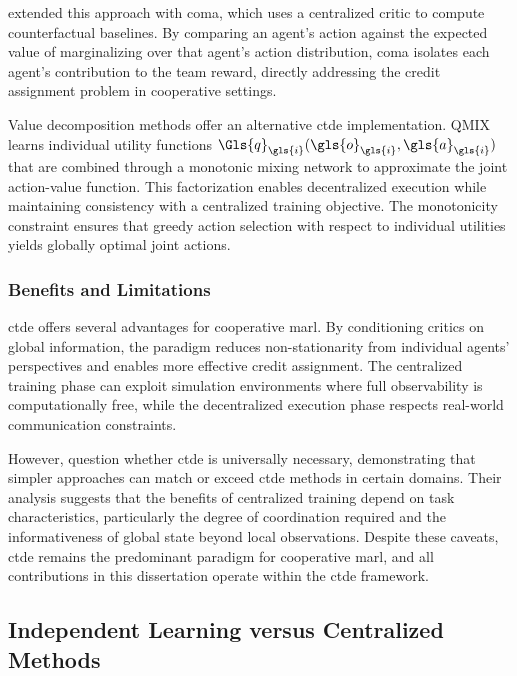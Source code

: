 \cite{foerster2018} extended this approach with \gls{coma}, 
which uses a centralized critic to compute counterfactual baselines. 
By comparing an agent's action against the expected value of 
marginalizing over that agent's action distribution, 
\gls{coma} isolates each agent's contribution to the team reward, 
directly addressing the credit assignment problem in cooperative settings.

Value decomposition methods offer an alternative \gls{ctde} implementation. 
QMIX \cite{rashid2018} learns individual utility functions 
\(\Gls{q}_{\gls{i}}(\gls{o}_{\gls{i}}, \gls{a}_{\gls{i}})\)
that are combined through a monotonic mixing network to 
approximate the joint action-value function.
This factorization enables decentralized execution while 
maintaining consistency with a centralized training objective. 
The monotonicity constraint ensures that greedy action 
selection with respect to individual utilities yields 
globally optimal joint actions.

\subsubsection{Benefits and Limitations}

\gls{ctde} offers several advantages for cooperative \gls{marl}.
By conditioning critics on global information, the paradigm reduces 
non-stationarity from individual agents' perspectives and enables 
more effective credit assignment. The centralized training phase can exploit 
simulation environments where full observability is computationally free, 
while the decentralized execution phase respects real-world communication constraints.

However, \cite{zhou2023} question whether \gls{ctde} is universally necessary, 
demonstrating that simpler approaches can match or exceed \gls{ctde} 
methods in certain domains. Their analysis suggests that the benefits 
of centralized training depend on task characteristics, 
particularly the degree of coordination required and the 
informativeness of global state beyond local observations. 
Despite these caveats, \gls{ctde} remains the predominant 
paradigm for cooperative \gls{marl}, and all contributions 
in this dissertation operate within the \gls{ctde} framework.

\subsection{Independent Learning versus Centralized Methods}
\label{subsec:independent-vs-centralized}

